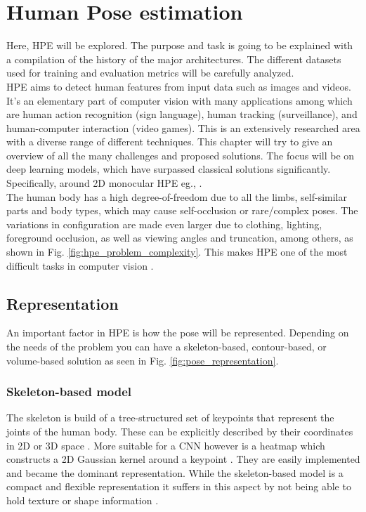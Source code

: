 \section{Human Pose estimation}
\label{sec:hpe}
Here, \gls{HPE} will be explored.
The purpose and task is going to be explained with a compilation of the history of the major architectures.
The different datasets used for training and evaluation metrics will be carefully analyzed.
\\
\gls{HPE} aims to detect human features from input data such as images and videos.
It's an elementary part of computer vision with many applications among which are human action recognition (sign language), human tracking (surveillance), and human-computer interaction (video games).
This is an extensively researched area with a diverse range of different techniques.
This chapter will try to give an overview of all the many challenges and proposed solutions.
The focus will be on deep learning models, which have surpassed classical solutions significantly.
Specifically, around 2D monocular \gls{HPE} eg., \cite{Munea2020, Zheng2012, Liu2104, chen2022}.
\\
The human body has a high degree-of-freedom due to all the limbs, self-similar parts and body types, which may cause self-occlusion or rare/complex poses.
The variations in configuration are made even larger due to clothing, lighting, foreground occlusion, as well as viewing angles and truncation, among others, as shown in Fig. \ref{fig:hpe_problem_complexity}.
This makes \gls{HPE} one of the most difficult tasks in computer vision \cite{jain2014, Chen2000}.

\subsection{Representation}
\label{section:representation}

An important factor in \gls{HPE} is how the pose will be represented.
Depending on the needs of the problem you can have a skeleton-based, contour-based, or volume-based solution \cite{Chen2000} as seen in Fig. \ref{fig:pose_representation}.

\subsubsection{Skeleton-based model}
The skeleton is build of a tree-structured set of keypoints that represent the joints of the human body.
These can be explicitly described by their coordinates in 2D or 3D space \cite{Toshev2014}.
More suitable for a \gls{CNN} however is a heatmap which constructs a 2D Gaussian kernel around a keypoint \cite{Liu2104, SWARH}.
They are easily implemented and became the dominant representation.
While the skeleton-based model is a compact and flexible representation it suffers in this aspect by not being able to hold texture or shape information \cite{Zheng2012}.


